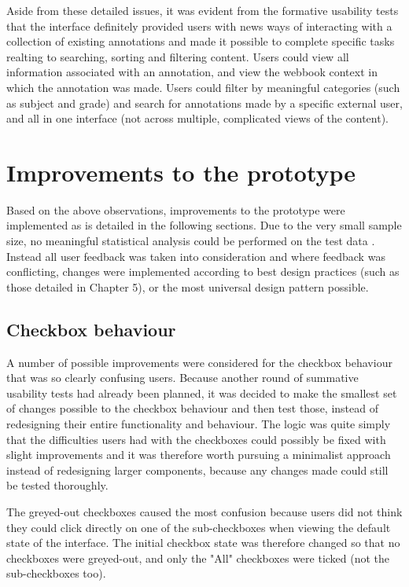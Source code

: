 Aside from these detailed issues, it was evident from the formative usability tests that the interface definitely provided users with news ways of interacting with a collection of existing annotations and made it possible to complete specific tasks realting to searching, sorting and filtering content. Users could view all information associated with an annotation, and view the webbook context in which the annotation was made. Users could filter by meaningful categories (such as subject and grade) and search for annotations made by a specific external user, and all in one interface (not across multiple, complicated views of the content).


\section{Improvements to the prototype}
Based on the above observations, improvements to the prototype were implemented as is detailed in the following sections. Due to the very small sample size, no meaningful statistical analysis could be performed on the test data \citep[p. 149]{Hartson}. Instead all user feedback was taken into consideration and where feedback was conflicting, changes were implemented according to best design practices (such as those detailed in Chapter 5), or the most universal design pattern possible.
\subsection{Checkbox behaviour}
A number of possible improvements were considered for the checkbox behaviour that was so clearly confusing users. Because another round of summative usability tests had already been planned, it was decided to make the smallest set of changes possible to the checkbox behaviour and then test those, instead of redesigning their entire functionality and behaviour. The logic was quite simply that the difficulties users had with the checkboxes could possibly be fixed with slight improvements and it was therefore worth pursuing a minimalist approach instead of redesigning larger components,  because any changes made could still be tested thoroughly.

The greyed-out checkboxes caused the most confusion because users did not think they could click directly on one of the sub-checkboxes when viewing the default state of the interface. The initial checkbox state was therefore changed so that no checkboxes were greyed-out, and only the "All" checkboxes were ticked (not the sub-checkboxes too).  

